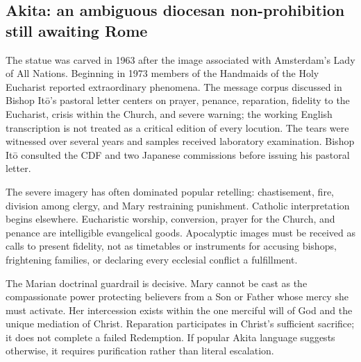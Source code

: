 \subsection{Akita: an ambiguous diocesan non-prohibition still awaiting Rome}


The statue was carved in 1963 after the image associated with Amsterdam's Lady of All Nations. Beginning in 1973 members of the Handmaids of the Holy Eucharist reported extraordinary phenomena. The message corpus discussed in Bishop Itō's pastoral letter centers on prayer, penance, reparation, fidelity to the Eucharist, crisis within the Church, and severe warning; the working English transcription is not treated as a critical edition of every locution. The tears were witnessed over several years and samples received laboratory examination. Bishop Itō consulted the CDF and two Japanese commissions before issuing his pastoral letter.

The severe imagery has often dominated popular retelling: chastisement, fire, division among clergy, and Mary restraining punishment. Catholic interpretation begins elsewhere. Eucharistic worship, conversion, prayer for the Church, and penance are intelligible evangelical goods. Apocalyptic images must be received as calls to present fidelity, not as timetables or instruments for accusing bishops, frightening families, or declaring every ecclesial conflict a fulfillment.

The Marian doctrinal guardrail is decisive. Mary cannot be cast as the compassionate power protecting believers from a Son or Father whose mercy she must activate. Her intercession exists within the one merciful will of God and the unique mediation of Christ. Reparation participates in Christ's sufficient sacrifice; it does not complete a failed Redemption. If popular Akita language suggests otherwise, it requires purification rather than literal escalation.

